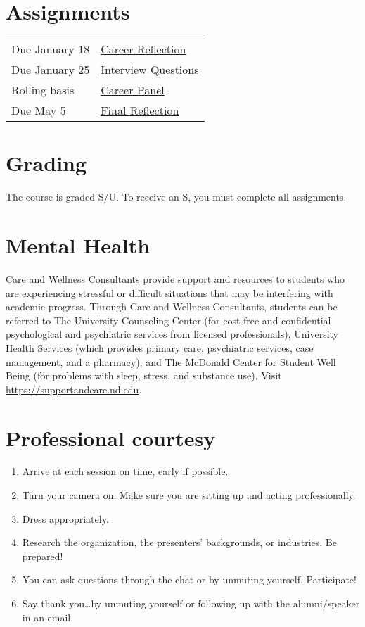 \documentclass[11pt]{article}
\begin{document}
\section{Assignments}
\label{sec:org67b8058}
\begin{center}
\begin{tabular}{ll}
Due January 18 & \href{https://forms.gle/395K9j9xREVQg88NA}{Career Reflection}\\
Due January 25 & \href{https://forms.gle/fRgPeqDvfJ78tRaY9}{Interview Questions}\\
Rolling basis & \href{https://drive.google.com/drive/folders/12p1B5icXV4FetwMoPTR7hkxTTPMj53qA?usp=sharing}{Career Panel}\\
Due May 5 & \href{https://forms.gle/GjdNjfbhfEXnvLEF6}{Final Reflection}\\
\end{tabular}
\end{center}

\section{Grading}
\label{sec:org80dc09b}
The course is graded S/U. To receive an S, you must complete all assignments.

\section{Mental Health}
\label{sec:org69a4572}
Care and Wellness Consultants provide support and resources to students who are experiencing stressful or difficult situations that may be interfering with academic progress. Through Care and Wellness Consultants, students can be referred to The University Counseling
Center (for cost-free and confidential psychological and psychiatric services from
licensed professionals), University Health Services (which provides primary care,
psychiatric services, case management, and a pharmacy), and The McDonald
Center for Student Well Being (for problems with sleep, stress, and substance
use). Visit \url{https://supportandcare.nd.edu}.

\section{Professional courtesy}
\label{sec:org4867033}
\begin{enumerate}
\item Arrive at each session on time, early if possible.
\item Turn your camera on. Make sure you are sitting up and acting professionally.
\item Dress appropriately.
\item Research the organization, the presenters’ backgrounds, or industries. Be prepared!
\item You can ask questions through the chat or by unmuting yourself. Participate!
\item Say thank you\ldots{}by unmuting yourself or following up with the alumni/speaker in an email.
\end{enumerate}
\end{document}
